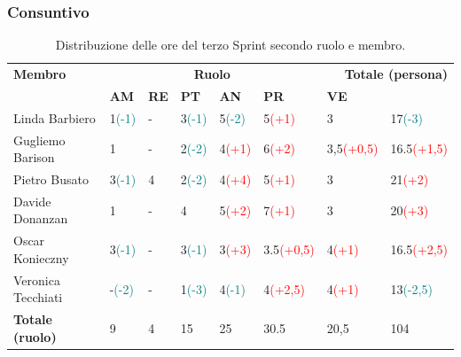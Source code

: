 \subsubsection{Consuntivo}
\begin{table}[ht!]
	\centering
	\begin{tabular}{p{3cm} p{1.4cm} p{1.6cm} p{1.7cm} p{1.4cm} p{1.4cm} p{1.5cm} p{2cm}}
		\toprule
        \textbf{Membro} & \multicolumn{5}{c}{\textbf{Ruolo}} & \multicolumn{2}{r}{\textbf{Totale (persona)}}\\
		& \textbf{AM} & \textbf{RE} & \textbf{PT} & \textbf{AN} & \textbf{PR} & \textbf{VE}\\
		\midrule
        Linda Barbiero     & 1\textcolor{teal}{(-1)} & - & 3\textcolor{teal}{(-1)} & 5\textcolor{teal}{(-2)} & 5\textcolor{red}{(+1)} & 3 & 17\textcolor{teal}{(-3)} \\
        Gugliemo Barison   & 1 & - & 2\textcolor{teal}{(-2)} & 4\textcolor{red}{(+1)} & 6\textcolor{red}{(+2)} & 3,5\textcolor{red}{(+0,5)} & 16.5\textcolor{red}{(+1,5)} \\
        Pietro Busato      & 3\textcolor{teal}{(-1)} & 4 & 2\textcolor{teal}{(-2)} & 4\textcolor{red}{(+4)} & 5\textcolor{red}{(+1)} & 3 & 21\textcolor{red}{(+2)} \\
        Davide Donanzan    & 1 & - & 4 & 5\textcolor{red}{(+2)} & 7\textcolor{red}{(+1)} & 3 & 20\textcolor{red}{(+3)} \\
        Oscar Konieczny    & 3\textcolor{teal}{(-1)} & - & 3\textcolor{teal}{(-1)} & 3\textcolor{red}{(+3)} & 3.5\textcolor{red}{(+0,5)} & 4\textcolor{red}{(+1)} & 16.5\textcolor{red}{(+2,5)}\\
        Veronica Tecchiati & -\textcolor{teal}{(-2)} & - & 1\textcolor{teal}{(-3)} & 4\textcolor{teal}{(-1)} & 4\textcolor{red}{(+2,5)} & 4\textcolor{red}{(+1)} & 13\textcolor{teal}{(-2,5)} \\
        \midrule
        \textbf{Totale (ruolo)} & 9 & 4 & 15 & 25 & 30.5 & 20,5 & 104 \\
		\bottomrule
	\end{tabular}
	\caption{Distribuzione delle ore del terzo Sprint secondo ruolo e membro.}
	\label{table:Distribuzione delle ore del terzo Sprint secondo ruolo e membr}
\end{table}
